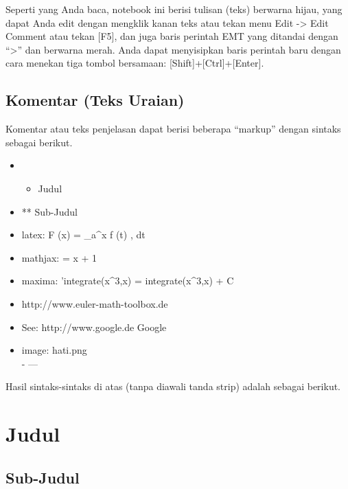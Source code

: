 \documentclass[
]{book}
\providecommand{\tightlist}{%
  \setlength{\itemsep}{0pt}\setlength{\parskip}{0pt}}
\begin{document}
Seperti yang Anda baca, notebook ini berisi tulisan (teks) berwarna hijau, yang dapat Anda edit dengan mengklik kanan teks atau tekan menu Edit -\textgreater{} Edit Comment atau tekan {[}F5{]}, dan juga baris perintah EMT yang ditandai dengan ``\textgreater{}'' dan berwarna merah. Anda dapat menyisipkan baris perintah baru dengan cara menekan tiga tombol bersamaan: {[}Shift{]}+{[}Ctrl{]}+{[}Enter{]}.

\section{Komentar (Teks Uraian)}\label{komentar-teks-uraian}

Komentar atau teks penjelasan dapat berisi beberapa ``markup'' dengan sintaks sebagai berikut.

\begin{itemize}
\tightlist
\item
  \begin{itemize}
  \tightlist
  \item
    Judul\\
  \end{itemize}
\item
  ** Sub-Judul\\
\item
  latex: F (x) = \int\_a\^{}x f (t) , dt\\
\item
  mathjax:  = x + 1\\
\item
  maxima: 'integrate(x\^{}3,x) = integrate(x\^{}3,x) + C\\
\item
  http://www.euler-math-toolbox.de\\
\item
  See: http://www.google.de \textbar{} Google\\
\item
  image: hati.png\\
  - ---
\end{itemize}

Hasil sintaks-sintaks di atas (tanpa diawali tanda strip) adalah sebagai berikut.

\chapter{Judul}\label{judul}

\section{Sub-Judul}\label{sub-judul}
\end{document}
